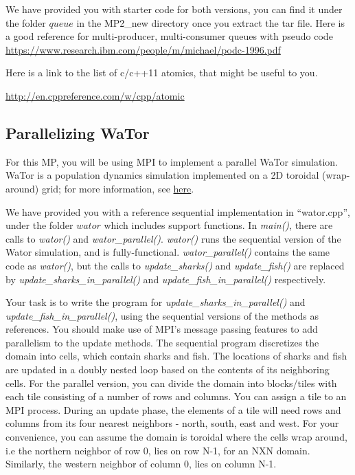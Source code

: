\documentclass[12pt]{article}
\begin{document}
We have provided you with starter code for both versions, you can find it under the folder $queue$ in the MP2\_new directory once you extract the tar file.
Here is a good reference for multi-producer, multi-consumer queues with pseudo code
\url{https://www.research.ibm.com/people/m/michael/podc-1996.pdf}

Here is a link to the list of c/c++11 atomics, that might be useful to you.

\url{http://en.cppreference.com/w/cpp/atomic}


\subsection{Parallelizing WaTor}


For this MP, you will be using MPI to implement a parallel WaTor simulation. WaTor is a population dynamics simulation implemented on a 2D toroidal (wrap-around) grid; for more information, see \href{https://en.wikipedia.org/wiki/WaTor}{here}.


We have provided you with a reference sequential implementation in ``wator.cpp'', under the folder $wator$ which includes support functions. In \textit{main()}, there are calls to \textit{wator()} and \textit{wator\_parallel()}. \textit{wator()} runs the sequential version of the Wator simulation, and is fully-functional. \textit{wator\_parallel()} contains the same code as \textit{wator()}, but the calls to \textit{update\_sharks()} and \textit{update\_fish()} are replaced by \textit{update\_sharks\_in\_parallel()} and \textit{update\_fish\_in\_parallel()} respectively.

Your task is to write the program for \textit{update\_sharks\_in\_parallel()} and \textit{update\_fish\_in\_parallel()}, using the sequential versions of the methods as references. You should make use of MPI's message passing features to add parallelism to the update methods.
The sequential program discretizes the domain into cells, which contain sharks and fish. The locations of sharks and fish are updated in a doubly nested loop based on the
contents of its neighboring cells.
For the parallel version, you can divide the domain into blocks/tiles with each tile consisting of a number of rows and columns. You can assign a tile to an MPI process.
During an update phase, the elements of a tile will need rows and columns from its four nearest neighbors - north, south, east and west.
For your convenience, you can assume the domain is toroidal where the cells wrap around, i.e the northern neighbor of row 0, lies on row N-1, for an NXN domain. Similarly, the western neighbor of column 0, lies on column N-1.
\end{document}
